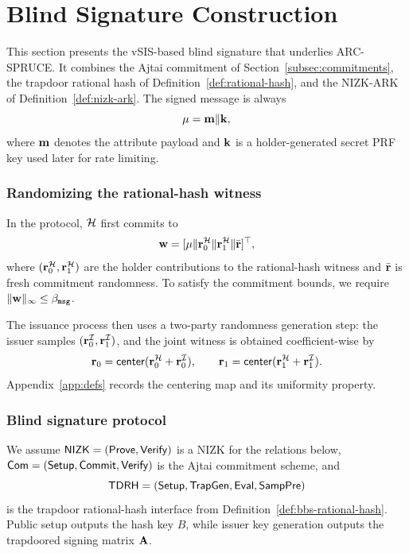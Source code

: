 \section{Blind Signature Construction}
\label{sec:blind-signature}

This section presents the vSIS-based blind signature that underlies ARC-SPRUCE. It combines the Ajtai commitment of
Section~\ref{subsec:commitments}, the trapdoor rational hash of Definition~\ref{def:rational-hash}, and the NIZK-ARK of
Definition~\ref{def:nizk-ark}. The signed message is always
\[
  \mathbf{\mu}=\mathbf{m}\Vert \mathbf{k},
\]
where \(\mathbf{m}\) denotes the attribute payload and \(\mathbf{k}\) is a holder-generated secret PRF key used later for rate
limiting.

\subsubsection{Randomizing the rational-hash witness}
In the protocol, \(\mathcal{H}\) first commits to
\[
  \mathbf{w}=[\mathbf{\mu}\Vert \mathbf{r}_0^{\mathcal{H}}\Vert \mathbf{r}_1^{\mathcal{H}}\Vert \bar{\mathbf{r}}]^\top,
\]
where \((\mathbf{r}_0^{\mathcal{H}},\mathbf{r}_1^{\mathcal{H}})\) are the holder contributions to the rational-hash witness and
\(\bar{\mathbf{r}}\) is fresh commitment randomness. To satisfy the commitment bounds, we require
\(\|\mathbf{w}\|_\infty\le \beta_{\mathtt{msg}}\).

The issuance process then uses a two-party randomness generation step: the issuer samples
\((\mathbf{r}_0^{\mathcal{I}},\mathbf{r}_1^{\mathcal{I}})\), and the joint witness is obtained coefficient-wise by
\[
  \mathbf{r}_0=\mathsf{center}(\mathbf{r}_0^{\mathcal{H}}+\mathbf{r}_0^{\mathcal{I}}),\qquad
  \mathbf{r}_1=\mathsf{center}(\mathbf{r}_1^{\mathcal{H}}+\mathbf{r}_1^{\mathcal{I}}).
\]
Appendix~\ref{app:defs} records the centering map and its uniformity property.

\subsubsection{Blind signature protocol}
\label{subsec:issuance-protocol}
\label{subsec:bs-protocol}
We assume \(\mathsf{NIZK}=(\mathsf{Prove},\mathsf{Verify})\) is a NIZK for the relations below,
\(\mathsf{Com}=(\mathsf{Setup},\mathsf{Commit},\mathsf{Verify})\) is the Ajtai commitment scheme, and
\[
  \mathsf{TDRH}=(\mathsf{Setup},\mathsf{TrapGen},\mathsf{Eval},\mathsf{SampPre})
\]
is the trapdoor rational-hash interface from Definition~\ref{def:bbs-rational-hash}. Public setup outputs the hash key
\(B\), while issuer key generation outputs the trapdoored signing matrix \(\mathbf{A}\).

